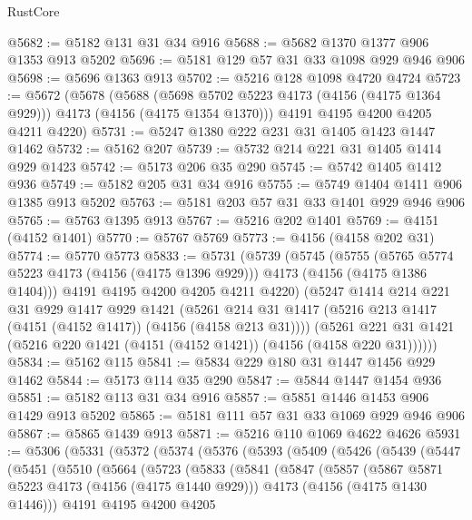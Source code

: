 \begin{lexlean}{RustCore}
\begin{coremodule}
@5682 := @5182 @131 @31 @34 @916
@5688 := @5682 @1370 @1377 @906 @1353 @913 @5202
@5696 := @5181 @129 @57 @31 @33 @1098 @929 @946 @906
@5698 := @5696 @1363 @913
@5702 := @5216 @128 @1098 @4720 @4724
@5723 := @5672
    (@5678
      (@5688 (@5698 @5702 @5223 @4173 (@4156 (@4175 @1364 @929))) @4173 (@4156 (@4175 @1354 @1370)))
      @4191
      @4195
      @4200
      @4205
      @4211
      @4220)
@5731 := @5247 @1380 @222 @231 @31 @1405 @1423 @1447 @1462
@5732 := @5162 @207
@5739 := @5732 @214 @221 @31 @1405 @1414 @929 @1423
@5742 := @5173 @206 @35 @290
@5745 := @5742 @1405 @1412 @936
@5749 := @5182 @205 @31 @34 @916
@5755 := @5749 @1404 @1411 @906 @1385 @913 @5202
@5763 := @5181 @203 @57 @31 @33 @1401 @929 @946 @906
@5765 := @5763 @1395 @913
@5767 := @5216 @202 @1401
@5769 := @4151 (@4152 @1401)
@5770 := @5767 @5769
@5773 := @4156 (@4158 @202 @31)
@5774 := @5770 @5773
@5833 := @5731
    (@5739
      (@5745
        (@5755
          (@5765 @5774 @5223 @4173 (@4156 (@4175 @1396 @929)))
          @4173
          (@4156 (@4175 @1386 @1404)))
        @4191
        @4195
        @4200
        @4205
        @4211
        @4220)
      (@5247
        @1414
        @214
        @221
        @31
        @929
        @1417
        @929
        @1421
        (@5261 @214 @31 @1417 (@5216 @213 @1417 (@4151 (@4152 @1417)) (@4156 (@4158 @213 @31))))
        (@5261 @221 @31 @1421 (@5216 @220 @1421 (@4151 (@4152 @1421)) (@4156 (@4158 @220 @31))))))
@5834 := @5162 @115
@5841 := @5834 @229 @180 @31 @1447 @1456 @929 @1462
@5844 := @5173 @114 @35 @290
@5847 := @5844 @1447 @1454 @936
@5851 := @5182 @113 @31 @34 @916
@5857 := @5851 @1446 @1453 @906 @1429 @913 @5202
@5865 := @5181 @111 @57 @31 @33 @1069 @929 @946 @906
@5867 := @5865 @1439 @913
@5871 := @5216 @110 @1069 @4622 @4626
@5931 := @5306
    (@5331
      (@5372
        (@5374
          (@5376
            (@5393
              (@5409
                (@5426
                  (@5439
                    (@5447
                      (@5451
                        (@5510
                          (@5664
                            (@5723
                              (@5833
                                (@5841
                                  (@5847
                                    (@5857
                                      (@5867 @5871 @5223 @4173 (@4156 (@4175 @1440 @929)))
                                      @4173
                                      (@4156 (@4175 @1430 @1446)))
                                    @4191
                                    @4195
                                    @4200
                                    @4205

\end{coremodule}
\end{lexlean}
